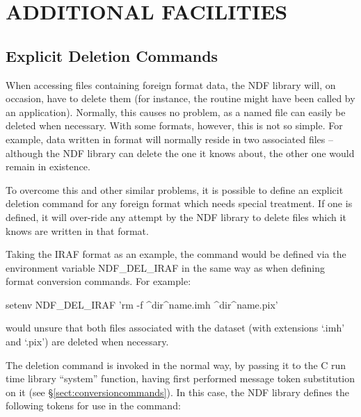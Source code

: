 \documentclass[11pt,twoside,nolof]{starlink}
\begin{document}
\section{ADDITIONAL FACILITIES}

\subsection{Explicit Deletion Commands}

When accessing files containing foreign format data, the NDF library
will, on occasion, have to delete them (for instance, the routine
 might have been called by an
application).  Normally, this causes no problem, as a named file can
easily be deleted when necessary.  With some formats, however, this is
not so simple. For example, data written in 
format will normally reside in two associated files -- although the
NDF library can delete the one it knows about, the other one would
remain in existence.

To overcome this and other similar problems, it is possible to define
an explicit deletion command for any foreign format which needs
special treatment. If one is defined, it will over-ride any attempt by
the NDF library to delete files which it knows are written in that
format.

Taking the IRAF format as an example, the command would be defined via
the environment variable NDF\_DEL\_IRAF in the same way as when
defining format conversion commands. For example:

\begin{terminalv}
setenv NDF_DEL_IRAF 'rm -f ^dir^name.imh ^dir^name.pix'
\end{terminalv}

would unsure that both files associated with the dataset (with
extensions `.imh' and `.pix') are deleted when necessary.

The deletion command is invoked in the normal way, by passing it to
the C run time library ``system'' function, having first performed
message token substitution on it (see
\S\ref{sect:conversioncommands}). In this case, the NDF library
defines the following tokens for use in the command:
\end{document}
